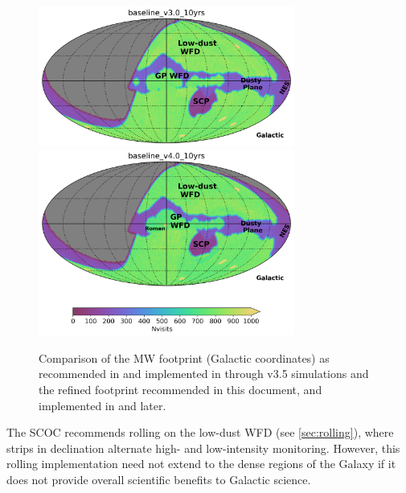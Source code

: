 \begin{figure}
\centering
    \includegraphics[width=0.75\textwidth]{figures/baseline_v3_0_10yrs_nvisits_galactic.png}
    \includegraphics[width=0.75\textwidth]{figures/baseline_v4_0_10yrs_nvisits_galactic.png}
    \caption{Comparison of the MW footprint (Galactic coordinates) as recommended in  and implemented in  through v3.5 simulations and the refined footprint recommended in this document, and implemented in  and later.}\label{fig:gpfootprint}
\end{figure}

The SCOC recommends rolling on the low-dust WFD (see \autoref{sec:rolling}), where strips in declination alternate high- and low-intensity monitoring. %
However, this rolling implementation need not extend to the dense regions of the Galaxy if it does not provide overall scientific benefits to Galactic science.

